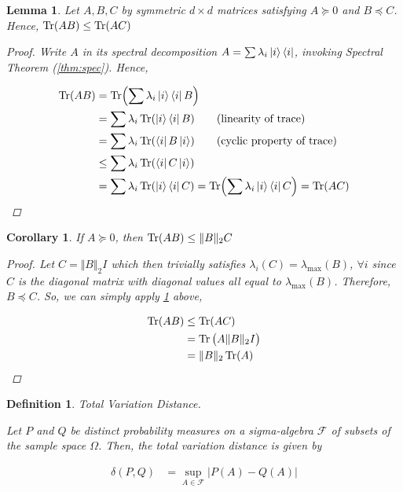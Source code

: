 \documentclass[11pt]{article}
\newcommand\0{\mathbf{0}}
\newcommand\<{\langle}
\renewcommand\>{\rangle}
\newtheorem{corollary}{Corollary}[theorem]
\newtheorem{lemma}[theorem]{Lemma}
\newtheorem{definition}[theorem]{Definition}
\begin{document}
\begin{lemma}
\label{lem:psd-trace}
Let $A, B, C$ by symmetric $d \times d$ matrices satisfying $A \succeq 0$ and $B \preceq C$. Hence, $\Tr(AB) \leq \Tr(AC)$

\begin{proof}
	Write $A$ in its spectral decomposition $A = \sum \lambda_i \ket{i}\bra{i}$, invoking Spectral Theorem (\ref{thm:spec}). Hence,
	
	\begin{align*}
		\Tr(AB) &= \Tr(\sum \lambda_i \ket{i}\bra{i} B)\\
		&= \sum \lambda_i \Tr(\ket{i}\bra{i} B) \tag{linearity of trace}\\
		&= \sum \lambda_i \Tr(\bra{i} B \ket{i}) \tag{cyclic property of trace}\\
		&\leq \sum \lambda_i \Tr(\bra{i} C \ket{i})\\
		&= \sum \lambda_i \Tr(\ket{i}\bra{i} C) = \Tr(\sum \lambda_i \ket{i}\bra{i} C) = \Tr(AC)
	\end{align*}
\end{proof}
\end{lemma}

\begin{corollary}
\label{cor:psd-tr-norm-ineq}
If $A \succeq 0$, then $\Tr(AB) \leq \Vert B \Vert_2 C$

\begin{proof}
Let $C = \Vert B \Vert_2 I$ which then trivially satisfies $\lambda_i(C) = \lambda_{\max}(B)$, $\forall i$ since $C$ is the diagonal matrix with diagonal values all equal to $\lambda_{\max}(B)$. Therefore, $B \preceq C$. So, we can simply apply \ref{lem:psd-trace} above,

\begin{align*}
\Tr(AB) &\leq \Tr(AC) \\
&= \Tr\big(A \Vert B \Vert_2 I\big)\\
&= \Vert B \Vert_2 \Tr(A)
\end{align*}
\end{proof}
\end{corollary}



\begin{definition} Total Variation Distance.
\label{def:tve}

Let $P$ and $Q$ be distinct probability measures on a sigma-algebra $\mathcal{F}$ of subsets of the sample space $\Omega$. Then, the total variation distance is given by

\begin{align*}
\delta(P, Q) &= \sup_{A \in \mathcal{F}}\vert P(A) - Q(A)\vert
\end{align*}
\end{definition}
\end{document}
